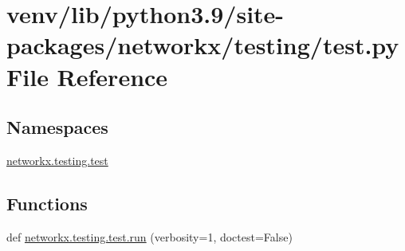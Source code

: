 \hypertarget{venv_2lib_2python3_89_2site-packages_2networkx_2testing_2test_8py}{}\section{venv/lib/python3.9/site-\/packages/networkx/testing/test.py File Reference}
\label{venv_2lib_2python3_89_2site-packages_2networkx_2testing_2test_8py}
\subsection*{Namespaces}
\begin{DoxyCompactItemize}
\item 
 \hyperlink{namespacenetworkx_1_1testing_1_1test}{networkx.\+testing.\+test}
\end{DoxyCompactItemize}
\subsection*{Functions}
\begin{DoxyCompactItemize}
\item 
def \hyperlink{namespacenetworkx_1_1testing_1_1test_a937ff5fab0c53edbe70a99f52697d84d}{networkx.\+testing.\+test.\+run} (verbosity=1, doctest=False)
\end{DoxyCompactItemize}
